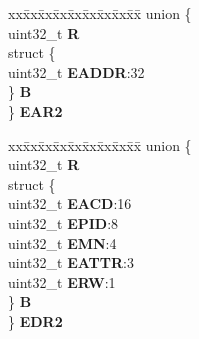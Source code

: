 \begin{DoxyCompactItemize}
\begin{tabbing}
\end{tabbing}\item 
\mbox{\label{structMPU__tag_af3f3f1f9b554014692105cb83f8b45ee}} 
\begin{tabbing}
xx\=xx\=xx\=xx\=xx\=xx\=xx\=xx\=xx\=\kill
union \{\\
\>uint32\_t {\bfseries R}\\
\>struct \{\\
\>\>uint32\_t {\bfseries EADDR}:32\\
\>\} {\bfseries B}\\
\} {\bfseries EAR2}\\

\end{tabbing}\item 
\mbox{\label{structMPU__tag_a1874cd1525daf63e8cc8168ef62ddbdd}} 
\begin{tabbing}
xx\=xx\=xx\=xx\=xx\=xx\=xx\=xx\=xx\=\kill
union \{\\
\>uint32\_t {\bfseries R}\\
\>struct \{\\
\>\>uint32\_t {\bfseries EACD}:16\\
\>\>uint32\_t {\bfseries EPID}:8\\
\>\>uint32\_t {\bfseries EMN}:4\\
\>\>uint32\_t {\bfseries EATTR}:3\\
\>\>uint32\_t {\bfseries ERW}:1\\
\>\} {\bfseries B}\\
\} {\bfseries EDR2}\\


\end{tabbing}
\end{DoxyCompactItemize}

